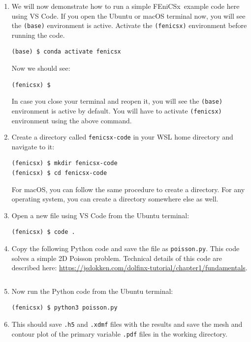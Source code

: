 \documentclass[12pt]{article}
\newcommand{\fenicsx}{\textsf{FEniCSx}}
\begin{document}
\begin{enumerate}[label={\arabic*.}, leftmargin= 0.6 cm,itemsep = 0.2cm,topsep=.2cm, parsep=0.2cm]

\item We will now demonstrate how to run a simple \fenicsx \ example code here using VS Code. If you open the Ubuntu or macOS terminal now, you will see the \texttt{(base)} environment is active. Activate the \texttt{(fenicsx)} environment before running the code.

\begin{lstlisting}[style=terminal]
(base) $ conda activate fenicsx
\end{lstlisting}

Now we should see:
\begin{lstlisting}[style=terminal]
(fenicsx) $ 
\end{lstlisting}

In case you close your terminal and reopen it, you will see the \texttt{(base)} environment is active by default. You will have to activate \texttt{(fenicsx)} environment using the above command.

\item Create a directory called \texttt{fenicsx-code} in your WSL home directory and navigate to it:

\begin{lstlisting}[style=terminal]
(fenicsx) $ mkdir fenicsx-code
(fenicsx) $ cd fenicsx-code
\end{lstlisting}

For macOS, you can follow the same procedure to create a directory. For any operating system, you can create a directory somewhere else as well.

\item Open a new file using VS Code from the Ubuntu terminal:

\begin{lstlisting}[style=terminal]
(fenicsx) $ code .
\end{lstlisting}

\item Copy the following Python code and save the file as \texttt{poisson.py}. This code solves a simple 2D Poisson problem. Technical details of this code are described here: \url{https://jsdokken.com/dolfinx-tutorial/chapter1/fundamentals}.
\inputminted[breaklines, breakafter=\_]{python}{poisson.py}

\item Now run the Python code from the Ubuntu terminal:
\begin{lstlisting}[style=terminal]
(fenicsx) $ python3 poisson.py
\end{lstlisting}

\item This should save \texttt{.h5} and \texttt{.xdmf} files with the results and save the mesh and contour plot of the primary variable \texttt{.pdf} files in the working directory.
\end{enumerate}
\end{document}
